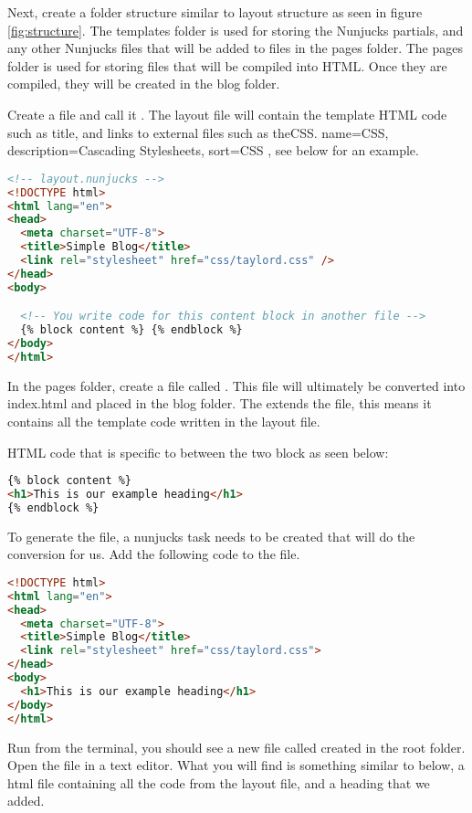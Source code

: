 Next, create a folder structure similar to layout structure as seen in figure \ref{fig:structure}. The templates folder is used for storing the Nunjucks partials, and any other Nunjucks files that will be added to files in the pages folder. The pages folder is used for storing files that will be compiled into \gls{HTML}. Once they are compiled, they will be created in the blog folder.

Create a file and call it . The layout file will contain the template \gls{HTML} code such as title, and links to external files such as the\gls{CSS}.
{
  name={CSS},
  description={Cascading Stylesheets},
  sort=CSS
}, see below for an example.

\begin{lstlisting}[language=HTML]
<!-- layout.nunjucks -->
<!DOCTYPE html>
<html lang="en">
<head>
  <meta charset="UTF-8">
  <title>Simple Blog</title>
  <link rel="stylesheet" href="css/taylord.css" />
</head>
<body>

  <!-- You write code for this content block in another file -->
  {% block content %} {% endblock %}
</body>
</html>
\end{lstlisting}

In the pages folder, create a file called . This file will ultimately be converted into index.html and placed in the blog folder. The  extends the  file, this means it contains all the template code written in the layout file. 

 \gls{HTML} code that is specific to  between the two block as seen below: 

\begin{lstlisting}[language=HTML]
{% block content %}
<h1>This is our example heading</h1>
{% endblock %}
\end{lstlisting}

To generate the  file, a nunjucks task needs to be created that will do the conversion for us. Add the following code to the  file.  

\begin{lstlisting}[language=HTML]
<!DOCTYPE html>
<html lang="en">
<head>
  <meta charset="UTF-8">
  <title>Simple Blog</title>
  <link rel="stylesheet" href="css/taylord.css">
</head>
<body>
  <h1>This is our example heading</h1>
</body>
</html>
\end{lstlisting}

Run  from the terminal, you should see a new file called  created in the root folder. Open the file in a text editor. What you will find is something similar to below, a html file containing all the code from the layout file, and a heading that we added. 

